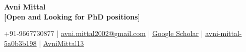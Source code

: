 \documentclass[a4paper,11pt]{article}
\newcommand{\socialicon}[1]{\raisebox{-0.05em}{\resizebox{!}{1em}{#1}}}
\newcommand{\headerfontiii}{\fontfamily{ppl}\selectfont} %
\begin{document}
\headerfontiii






\begin{center}
    {\Huge\textbf{Avni Mittal}}
  \\[-0.8mm]
  {\small\textcolor{pastelred}{\textbf{[Open and Looking for PhD positions]}}}
\end{center}
\vspace{-4mm}

\begin{center}
    \small{
    +91-9667730877 | \href{mailto:avni.mittal2002@gmail.com}{avni.mittal2002@gmail.com} 
    |
    \href{https://scholar.google.com/citations?user=itURCtMAAAAJ&hl=en}{Google Scholar} 
    |
    \socialicon{\faLinkedin} \href{linkedin.com/in/avni-mittal-5a0b3b198/}{avni-mittal-5a0b3b198} | 
    \socialicon{\faGithub} \href{https://avnimittal13.github.io/portfolio/}{AvniMittal13} 
    }
\end{center}
\vspace{-5mm}
\end{document}

